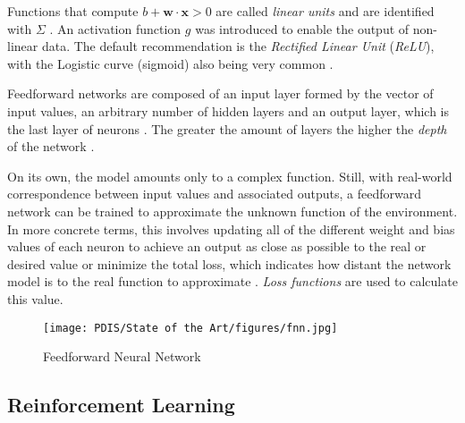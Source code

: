 \documentclass[11pt,a4paper]{article}
\begin{document}
Functions that compute $b + \textbf{w} \cdot \textbf{x} > 0$ are called \textit{linear units} and are identified with $\Sigma$ \cite{charniakIntroductionDeepLearning2018, goodfellowDeepLearning2016}. An activation function $g$ was introduced to enable the output of non-linear data. The default recommendation is the \textit{Rectified Linear Unit} (\textit{ReLU}), with the Logistic curve (sigmoid) also being very common \cite{goodfellowDeepLearning2016}.  \par
Feedforward networks are composed of an input layer formed by the vector of input values, an arbitrary number of hidden layers and an output layer, which is the last layer of neurons \cite{charniakIntroductionDeepLearning2018}. The greater the amount of layers the higher the \textit{depth} of the network \cite{charniakIntroductionDeepLearning2018, goodfellowDeepLearning2016}. \par
On its own, the model amounts only to a complex function. Still, with real-world correspondence between input values and associated outputs, a feedforward network can be trained to approximate the unknown function of the environment. In more concrete terms, this involves updating all of the different weight and bias values of each neuron to achieve an output as close as possible to the real or desired value or minimize the total loss, which indicates how distant the network model is to the real function to approximate \cite{charniakIntroductionDeepLearning2018, goodfellowDeepLearning2016}. \textit{Loss functions} are used to calculate this value.

\begin{figure}
    \centering
    \texttt{[image: PDIS/State of the Art/figures/fnn.jpg]}
    \caption{Feedforward Neural Network \cite{FeedforwardNeuralNetwork}}
    \label{fig:fnn}
\end{figure}


\subsection{Reinforcement Learning}

\begin{comment}
* SAC
* DDPG
* DQN
\end{comment}
\end{document}
